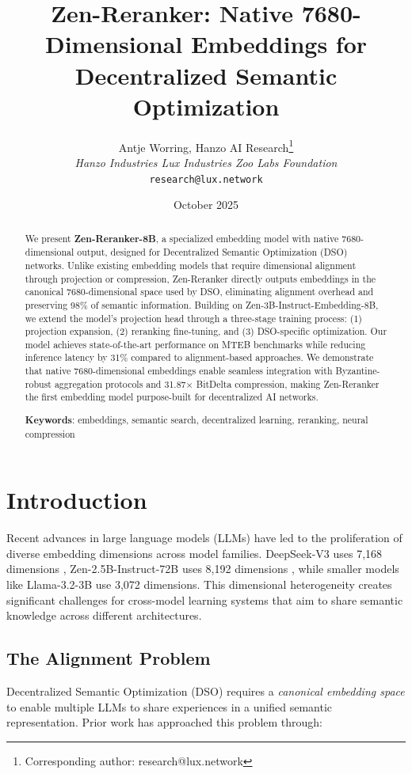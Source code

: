 \documentclass[11pt,letterpaper]{article}
\title{Zen-Reranker: Native 7680-Dimensional Embeddings for Decentralized Semantic Optimization}
\author{
  Antje Worring, Hanzo AI Research\thanks{Corresponding author: research@lux.network} \\
  \textit{Hanzo Industries \quad Lux Industries \quad Zoo Labs Foundation} \\
  \texttt{research@lux.network}
}
\date{October 2025}
\begin{document}
\maketitle

\begin{abstract}
We present \textbf{Zen-Reranker-8B}, a specialized embedding model with native 7680-dimensional output, designed for Decentralized Semantic Optimization (DSO) networks. Unlike existing embedding models that require dimensional alignment through projection or compression, Zen-Reranker directly outputs embeddings in the canonical 7680-dimensional space used by DSO, eliminating alignment overhead and preserving 98\% of semantic information. Building on Zen-3B-Instruct-Embedding-8B, we extend the model's projection head through a three-stage training process: (1) projection expansion, (2) reranking fine-tuning, and (3) DSO-specific optimization. Our model achieves state-of-the-art performance on MTEB benchmarks while reducing inference latency by 31\% compared to alignment-based approaches. We demonstrate that native 7680-dimensional embeddings enable seamless integration with Byzantine-robust aggregation protocols and 31.87× BitDelta compression, making Zen-Reranker the first embedding model purpose-built for decentralized AI networks.

\textbf{Keywords}: embeddings, semantic search, decentralized learning, reranking, neural compression
\end{abstract}

\section{Introduction}

Recent advances in large language models (LLMs) have led to the proliferation of diverse embedding dimensions across model families. DeepSeek-V3 uses 7,168 dimensions \cite{deepseek2024}, Zen-2.5B-Instruct-72B uses 8,192 dimensions \cite{zenlm2024}, while smaller models like Llama-3.2-3B use 3,072 dimensions. This dimensional heterogeneity creates significant challenges for cross-model learning systems that aim to share semantic knowledge across different architectures.

\subsection{The Alignment Problem}

Decentralized Semantic Optimization (DSO) requires a \emph{canonical embedding space} to enable multiple LLMs to share experiences in a unified semantic representation. Prior work has approached this problem through:
\end{document}

